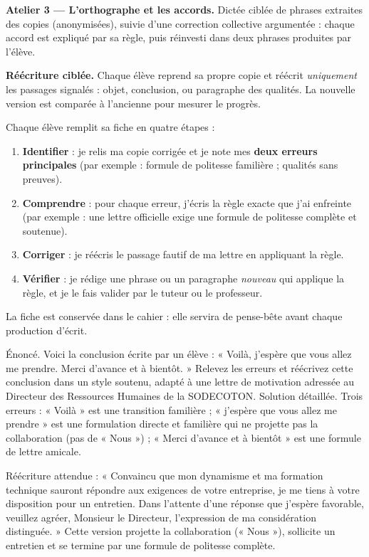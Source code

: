 \documentclass[11pt]{article}
\begin{document}
\textbf{Atelier 3 — L'orthographe et les accords.} Dictée ciblée de phrases extraites des copies (anonymisées), suivie d'une correction collective argumentée : chaque accord est expliqué par sa règle, puis réinvesti dans deux phrases produites par l'élève.

\textbf{Réécriture ciblée.} Chaque élève reprend sa propre copie et réécrit \emph{uniquement} les passages signalés : objet, conclusion, ou paragraphe des qualités. La nouvelle version est comparée à l'ancienne pour mesurer le progrès.

\begin{methode}
Chaque élève remplit sa fiche en quatre étapes :
\begin{enumerate}
\item \textbf{Identifier} : je relis ma copie corrigée et je note mes \textbf{deux erreurs principales} (par exemple : formule de politesse familière ; qualités sans preuves).
\item \textbf{Comprendre} : pour chaque erreur, j'écris la règle exacte que j'ai enfreinte (par exemple : une lettre officielle exige une formule de politesse complète et soutenue).
\item \textbf{Corriger} : je réécris le passage fautif de ma lettre en appliquant la règle.
\item \textbf{Vérifier} : je rédige une phrase ou un paragraphe \emph{nouveau} qui applique la règle, et je le fais valider par le tuteur ou le professeur.
\end{enumerate}
La fiche est conservée dans le cahier : elle servira de pense-bête avant chaque production d'écrit.
\end{methode}

\begin{exoresolu}
Énoncé. Voici la conclusion écrite par un élève : « Voilà, j'espère que vous allez me prendre. Merci d'avance et à bientôt. » Relevez les erreurs et réécrivez cette conclusion dans un style soutenu, adapté à une lettre de motivation adressée au Directeur des Ressources Humaines de la SODECOTON.
\tcblower
Solution détaillée. Trois erreurs : « Voilà » est une transition familière ; « j'espère que vous allez me prendre » est une formulation directe et familière qui ne projette pas la collaboration (pas de « Nous ») ; « Merci d'avance et à bientôt » est une formule de lettre amicale.

Réécriture attendue : « Convaincu que mon dynamisme et ma formation technique sauront répondre aux exigences de votre entreprise, je me tiens à votre disposition pour un entretien. Dans l'attente d'une réponse que j'espère favorable, veuillez agréer, Monsieur le Directeur, l'expression de ma considération distinguée. » Cette version projette la collaboration (« Nous »), sollicite un entretien et se termine par une formule de politesse complète.
\end{exoresolu}
\end{document}
